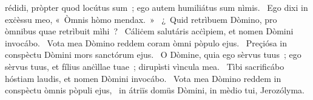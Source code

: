 { }
{%
rédidi, pròpter quod locútus sum~; ego autem humiliátus sum nìmis. 
~Ego dixi in exċèssu meo, «~Òmnis hòmo mendax.~»
~¿~Quid retrìbuem Dòmino, pro òmnibus quae retrìbuit mìhi~? 
~Cáliċem salutáris acċìpiem, et nomen Dòmini invocábo. 
~Vota mea Dòmino reddem coram òmni pòpulo ejus. 
~Preçiósa in conspèctu Dòmini mors sanctórum ejus. 
~O Dòmine, quia ego sèrvus tuus~; ego sèrvus tuus, et fílius anċìllae tuae~; dirupìsti vìncula mea. 
~Tìbi sacrificábo hóstiam laudis, et nomen Dòmini invocábo. 
~Vota mea Dòmino reddem in conspèctu òmnis pòpuli ejus, 
~in átriïs domüs Dòmini, in mèdio tui, Jerozólyma. 
}
